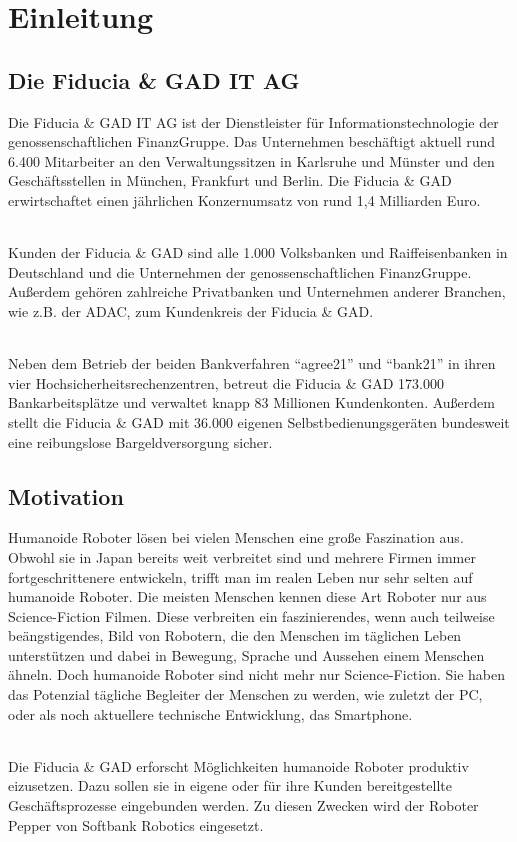 \chapter{Einleitung}\label{sec:einleitung}
\section{Die Fiducia \& GAD IT AG}\label{sec:fiducia-gad}
Die Fiducia \& GAD IT AG ist der Dienstleister für Informationstechnologie der
genossenschaftlichen FinanzGruppe. Das Unternehmen beschäftigt aktuell rund
6.400 Mitarbeiter an den Verwaltungssitzen in Karlsruhe und Münster und den
Geschäftsstellen in München, Frankfurt und Berlin. Die Fiducia \& GAD
erwirtschaftet einen jährlichen Konzernumsatz von rund 1,4 Milliarden Euro.

\subparagraph{}
Kunden der Fiducia \& GAD sind alle 1.000 Volksbanken und Raiffeisenbanken in
Deutschland und die Unternehmen der genossenschaftlichen FinanzGruppe. Außerdem
gehören zahlreiche Privatbanken und Unternehmen anderer Branchen, wie z.B. der
ADAC, zum Kundenkreis der Fiducia \& GAD.

\subparagraph{}
Neben dem Betrieb der beiden Bankverfahren "`agree21"' und "`bank21"' in ihren
vier Hochsicherheitsrechenzentren, betreut die Fiducia \& GAD 173.000
Bankarbeitsplätze und verwaltet knapp 83 Millionen Kundenkonten. Außerdem stellt
die Fiducia \& GAD mit 36.000 eigenen Selbstbedienungsgeräten bundesweit eine
reibungslose Bargeldversorgung sicher. \cite{FiduciaGAD2018}

\section{Motivation}\label{sec:motivation}
Humanoide Roboter lösen bei vielen Menschen eine große Faszination aus. Obwohl
sie in Japan bereits weit verbreitet sind und mehrere Firmen immer
fortgeschrittenere entwickeln, trifft man im realen Leben nur sehr selten auf
humanoide Roboter. Die meisten Menschen kennen diese Art Roboter nur aus
Science-Fiction Filmen. Diese verbreiten ein faszinierendes, wenn auch teilweise
beängstigendes, Bild von Robotern, die den Menschen im täglichen Leben
unterstützen und dabei in Bewegung, Sprache und Aussehen einem Menschen ähneln.
Doch humanoide Roboter sind nicht mehr nur Science-Fiction. Sie haben das
Potenzial tägliche Begleiter der Menschen zu werden, wie zuletzt der PC, oder
als noch aktuellere technische Entwicklung, das Smartphone.

\subparagraph{}
Die Fiducia \& GAD erforscht Möglichkeiten humanoide Roboter produktiv
eizusetzen. Dazu sollen sie in eigene oder für ihre Kunden bereitgestellte
Geschäftsprozesse eingebunden werden. Zu diesen Zwecken wird der Roboter Pepper
von Softbank Robotics eingesetzt.

